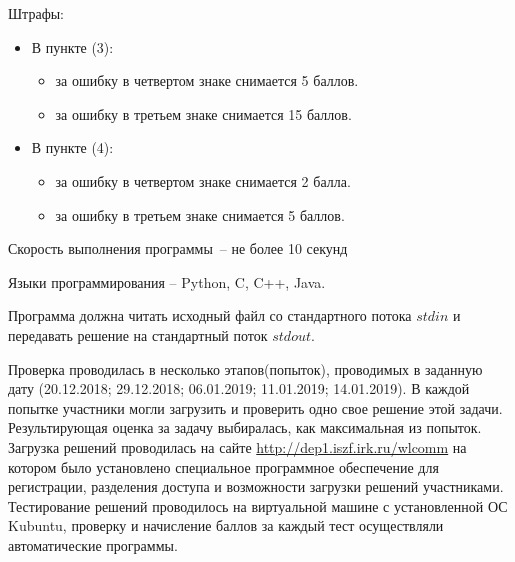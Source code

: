 Штрафы:
\begin{itemize}
    \item В пункте (3):
    \begin{itemize}
        \item за ошибку в четвертом знаке снимается 5 баллов.
        \item за ошибку в третьем знаке снимается 15 баллов.
    \end{itemize}
    \item В пункте (4):
    \begin{itemize}
        \item за ошибку в четвертом знаке снимается 2 балла.
        \item за ошибку в третьем знаке снимается 5 баллов.
    \end{itemize}
\end{itemize}

Скорость выполнения программы~-- не более 10 секунд

Языки программирования -- Python, C, C++, Java.

Программа должна читать исходный файл со стандартного потока $stdin$ и передавать решение на стандартный поток $stdout$.


Проверка проводилась в несколько этапов(попыток), проводимых в заданную дату (20.12.2018; 29.12.2018; 06.01.2019; 11.01.2019; 14.01.2019). В каждой попытке участники могли загрузить и проверить одно свое решение этой задачи.
Результирующая оценка за задачу выбиралась, как максимальная из попыток.
Загрузка решений проводилась на сайте \url{http://dep1.iszf.irk.ru/wlcomm} на котором было установлено специальное программное обеспечение для регистрации, разделения доступа и возможности загрузки решений участниками.
Тестирование решений проводилось на виртуальной машине с установленной ОС Kubuntu, проверку и начисление баллов за каждый тест осуществляли автоматические программы.

\explanationSection


